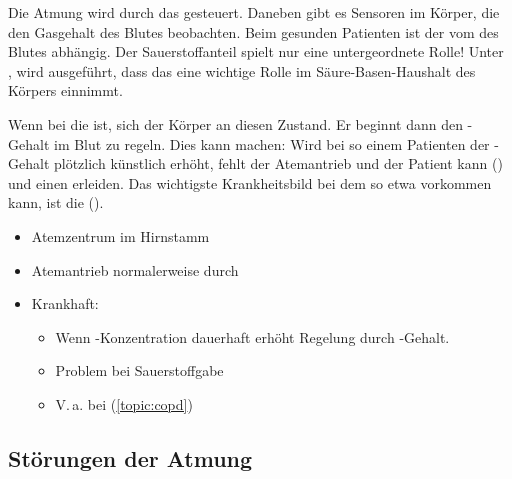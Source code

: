 



{%
Die Atmung wird durch das 
gesteuert. Daneben gibt es Sensoren im Körper, die den
Gasgehalt des Blutes beobachten.
Beim gesunden Patienten ist der  vom
 des Blutes abhängig. Der
Sauerstoffanteil spielt nur eine untergeordnete Rolle! Unter
, wird
ausgeführt, dass das  eine wichtige Rolle im
Säure-Basen-Haushalt des Körpers einnimmt.

Wenn bei  die
 ist, 
sich der Körper an diesen Zustand. Er beginnt dann den
-Gehalt im Blut zu
regeln.
Dies kann  machen: Wird bei so einem Patienten
der -Gehalt plötzlich künstlich erhöht, fehlt der
Atemantrieb und der Patient kann 
() und
einen  erleiden.
Das wichtigste Krankheitsbild bei dem so etwa vorkommen kann,
ist die  ().
}{
\begin{itemize}
  \item Atemzentrum im Hirnstamm
  \item Atemantrieb normalerweise durch 
  \item Krankhaft:
  \begin{itemize}
    \item Wenn -Konzentration dauerhaft erhöht
     Regelung durch
    -Gehalt.
    \item Problem bei Sauerstoffgabe
    \item V.\,a. bei  (\ref{topic:copd})
  \end{itemize}
\end{itemize}
}{}{}{}





\subsection{Störungen der Atmung}
\label{topic:atemstörungen}
\label{topic:atemstillstand}

